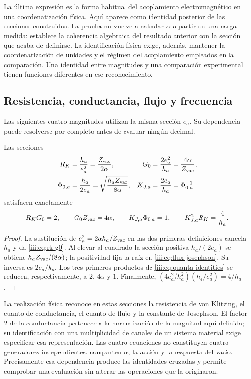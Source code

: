 La última expresión es la forma habitual del acoplamiento electromagnético
en una coordenatización física. Aquí aparece como identidad posterior de las secciones
construidas. La prueba no vuelve a calcular $\alpha$ a partir de una carga
medida: establece la coherencia algebraica del resultado anterior con la
sección que acaba de definirse. La identificación física exige, además,
mantener la coordenatización de unidades y el régimen del acoplamiento empleados en la
comparación. Una identidad entre magnitudes y una comparación experimental
tienen funciones diferentes en ese reconocimiento.

\subsection{Resistencia, conductancia, flujo y frecuencia}

Las siguientes cuatro magnitudes utilizan la misma sección $e_a$. Su
dependencia puede resolverse por completo antes de evaluar ningún decimal.

\begin{theorem}
Las secciones
\begin{align}
 R_K&=\frac{h_a}{e_a^2}=\frac{Z_{\rm vac}}{2\alpha},
 &G_0&=\frac{2e_a^2}{h_a}=\frac{4\alpha}{Z_{\rm vac}},
 \label{iii:eq:rk-g0}\\
 \Phi_{0,a}&=\frac{h_a}{2e_a}
 =\sqrt{\frac{h_aZ_{\rm vac}}{8\alpha}},
 &K_{J,a}&=\frac{2e_a}{h_a}=\Phi_{0,a}^{-1}
 \label{iii:eq:flux-josephson}
\end{align}
satisfacen exactamente
\begin{equation}
 R_KG_0=2,\qquad G_0Z_{\rm vac}=4\alpha,\qquad
 K_{J,a}\Phi_{0,a}=1,\qquad
 K_{J,a}^{2}R_K=\frac4{h_a}.
 \label{iii:eq:quanta-identities}
\end{equation}
\end{theorem}
\begin{proof}
La sustitución de $e_a^2=2\alpha h_a/Z_{\rm vac}$ en las dos primeras
definiciones cancela $h_a$ y da \eqref{iii:eq:rk-g0}. Al elevar al
cuadrado la sección positiva $h_a/(2e_a)$ se obtiene
$h_aZ_{\rm vac}/(8\alpha)$; la positividad fija la raíz en
\eqref{iii:eq:flux-josephson}. Su inversa es $2e_a/h_a$.
Los tres primeros productos de \eqref{iii:eq:quanta-identities} se
reducen, respectivamente, a $2$, $4\alpha$ y $1$. Finalmente,
$(4e_a^2/h_a^2)(h_a/e_a^2)=4/h_a$.
\end{proof}

La realización física reconoce en estas secciones la resistencia de von
Klitzing, el cuanto de conductancia, el cuanto de flujo y la constante de
Josephson. El factor $2$ de la conductancia pertenece a la normalización
de la magnitud aquí definida; su identificación con una multiplicidad de
canales de un sistema material exige especificar esa representación.
Las cuatro ecuaciones no constituyen cuatro generadores independientes:
comparten $\alpha$, la acción y la respuesta del vacío. Precisamente esa
dependencia produce las identidades cruzadas y permite comprobar una
evaluación sin alterar las operaciones que la originaron.

